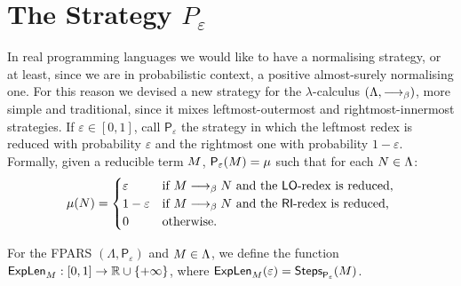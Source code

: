 \section{The Strategy $P_\varepsilon$}
In real programming languages we would like to have a normalising strategy, or at least, since we are in probabilistic context, a positive almost-surely normalising one. For this reason we devised a new strategy for the $\lambda$-calculus $(\Lambda,\longrightarrow_\beta)$, more simple and traditional, since it mixes leftmost-outermost and rightmost-innermost strategies. If $\varepsilon\in[0,1]$, call $\mathsf{P}_\varepsilon$ the strategy in which the leftmost redex is reduced with probability $\varepsilon$ and the rightmost one with probability $1-\varepsilon$. Formally, given a reducible term $M$, $\mathsf{P}_\varepsilon(M)=\mu$ such that for each $N\in\Lambda$:
$$
\mu(N)=\begin{cases}
\varepsilon & \text{if }M\longrightarrow_\beta N\text{ and the }\textsf{LO}\text{-redex is reduced,}\\
1-\varepsilon & \text{if }M\longrightarrow_\beta N\text{ and the }\textsf{RI}\text{-redex is reduced,}\\
0 & \text{otherwise}.\\
\end{cases}
$$
\begin{notation}
	For the FPARS $(\Lambda,\mathsf{P}_\varepsilon)$ and $M\in\Lambda$, we define the function $\textsf{ExpLen}_{M}:[0,1]\rightarrow\mathbb{R}\cup\{+\infty\}$, where
	$\textsf{ExpLen}_{M}(\varepsilon)=\textsf{Steps}_{\mathsf{P}_\varepsilon}(M)$.
\end{notation}
